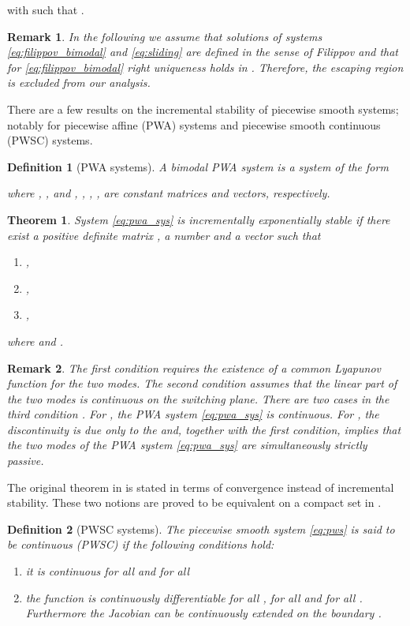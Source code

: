 \documentclass[twocolumn]{autart}
\newtheorem{theorem}{Theorem}
\newtheorem{definition}{Definition}
\newtheorem{remark}{Remark}
\begin{document}
with  such that . 
\begin{remark}
In the following we assume that solutions of systems \eqref{eq:filippov_bimodal} and \eqref{eq:sliding} are defined in the sense of  Filippov and  that for \eqref{eq:filippov_bimodal} \emph{right uniqueness} \citep[pag. 106]{filippov1988differential} holds in . Therefore, the escaping region is excluded from our analysis. 
\end{remark}
There are a few results on the incremental stability of piecewise smooth systems; notably for piecewise affine (PWA) systems and piecewise smooth continuous (PWSC) systems.
\begin{definition}[PWA systems]
A bimodal PWA system is a system of the form

where , , and , , , , are constant matrices and vectors, respectively.
\end{definition}
\begin{theorem}
\label{thm:pwa_pavlov}
\citep{pavlov2007convergence} System \eqref{eq:pwa_sys} is incrementally exponentially stable if there exist a positive definite matrix , a number  and a vector  such that
\begin{enumerate}
\item
\label{eq:thm:pavlov:1}
,
\item
\label{eq:thm:pavlov:2}
,
\item
\label{eq:thm:pavlov:3}
,
\end{enumerate}
where  and .
\end{theorem}
\begin{remark}
The first condition requires the existence of a common Lyapunov function  for the two modes. The second condition assumes that the linear part of the two modes is continuous on the switching plane. There are two cases in the third condition  \citep[see][Remark 4]{pavlov2007convergence}. For , the PWA system \eqref{eq:pwa_sys} is continuous. For , the discontinuity is due only to the  and, together with the first condition, implies that the two modes of the PWA system \eqref{eq:pwa_sys} are simultaneously strictly passive. 
\end{remark}
The original theorem in \citep[Theorem 2]{pavlov2007convergence}  is stated in terms of convergence instead of incremental stability. These two notions are proved to be equivalent on a compact set in \citep{ruffer2013convergent}.
\begin{definition}[PWSC systems]
\label{def:PWSC}
The piecewise smooth system \eqref{eq:pws} is said to be continuous (PWSC) if the following conditions hold:
\begin{enumerate}
\item
it is continuous for all  and for all 
\item
the function  is continuously differentiable for all , for all  and for all . Furthermore the Jacobian  can be continuously extended on the boundary .
\end{enumerate}
\end{definition}
\end{document}
